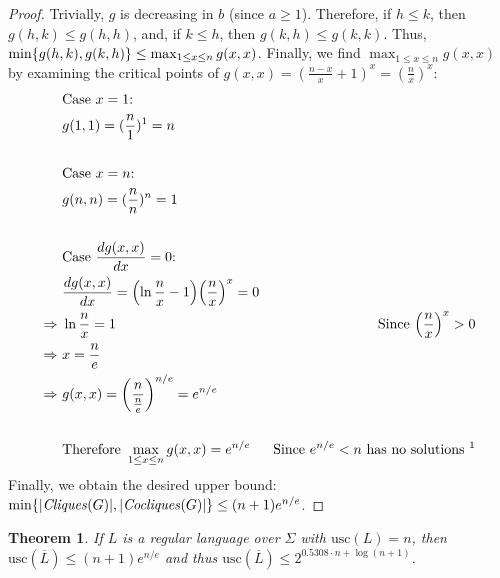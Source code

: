 \documentclass{report}
\DeclarePairedDelimiter{\set}{\{}{\}}
\DeclarePairedDelimiter{\abs}{\lvert}{\rvert}
\DeclarePairedDelimiter{\bracks}{(}{)}
\newtheorem{theorem}{Theorem}[section]
\theoremstyle{definition}
\begin{document}
\begin{proof}
Trivially, $g$ is decreasing in $b$ (since $a \geq 1$). Therefore, if $h \leq k$,
then $g(h, k) \leq g(h, h)$, and, if $k \leq h$, then $g(k, h) \leq g(k, k)$.
Thus, $\min\set{g(h, k), g(k, h)} \leq \max_{1 \leq x \leq n} g(x, x)$.
Finally, we find $\max_{1 \leq x \leq n} g(x, x)$ by examining the critical
points of $g(x, x) = (\frac{n - x}{x} + 1)^x = (\frac{n}{x})^x$:
\begin{align*}
& \text{Case } x = 1 \text{:} \\
& g(1, 1) = (\frac{n}{1})^1 = n \\
\\
& \text{Case } x = n \text{:} \\
& g(n, n) = (\frac{n}{n})^n = 1 \\
\\
& \text{Case } \frac{d g(x, x)}{d x} = 0 \text{:} \\
& \frac{d g(x, x)}{d x} = \bracks*{\ln \frac{n}{x} - 1}
\bracks*{\frac{n}{x}}^x = 0 \\
\Rightarrow \ & \ln \frac{n}{x} = 1
& \text{Since } \bracks*{\frac{n}{x}}^x > 0 \\
\Rightarrow \ & x = \frac{n}{e} \\
\Rightarrow \ & g(x, x) = \bracks*{\frac{n}{\frac{n}{e}}}^{n / e} = e^{n / e} \\
\\
& \text{Therefore } \max_{1 \leq x \leq n} g(x, x) = e^{n / e}
& \text{Since } e^{n / e} < n \text{ has no solutions \footnotemark}
\end{align*}
Finally, we obtain the desired upper bound:
$\min\set{\abs{\mathit{Cliques}(G)}, \abs{\mathit{Cocliques}(G)}} \leq (n + 1) e^{n / e}$.

\end{proof}

\begin{theorem} \label{thm.complement_usc}
If $L$ is a regular language over $\Sigma$ with $\mathrm{usc}(L) = n$, then
$\mathrm{usc}(\overline{L}) \leq (n + 1) e^{n / e}$ and thus 
$\mathrm{usc}(\overline{L}) \leq 2^{0.5308 \cdot n + \log (n + 1)}$.
\end{theorem}
\end{document}
